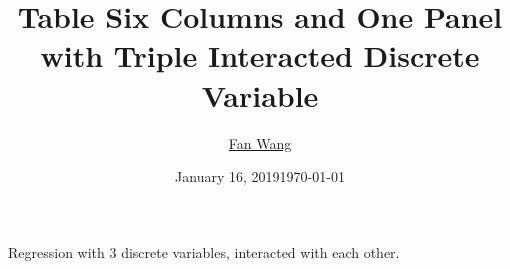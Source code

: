 \documentclass[12pt,english]{article}
\date{January 16, 2019}
\title{Table Six Columns and One Panel with Triple Interacted Discrete Variable}
\author{\href{fanwangecon.github.io}{Fan Wang}}
\date{\today}
\begin{document}
\maketitle

Regression with 3 discrete variables, interacted with each other.


\end{document}
